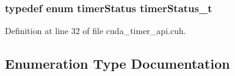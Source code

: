 \subsubsection[{timer\+Status\+\_\+t}]{\setlength{\rightskip}{0pt plus 5cm}typedef enum {\bf timer\+Status} {\bf timer\+Status\+\_\+t}}\label{cuda__timer__api_8cuh_a27fad73c3da5a06a8d7ae755180ce324}


Definition at line 32 of file cuda\+\_\+timer\+\_\+api.\+cuh.



\subsection{Enumeration Type Documentation}
\hypertarget{cuda__timer__api_8cuh_a6c659d595b94b16f6ab6881f9bad1e30}{}
